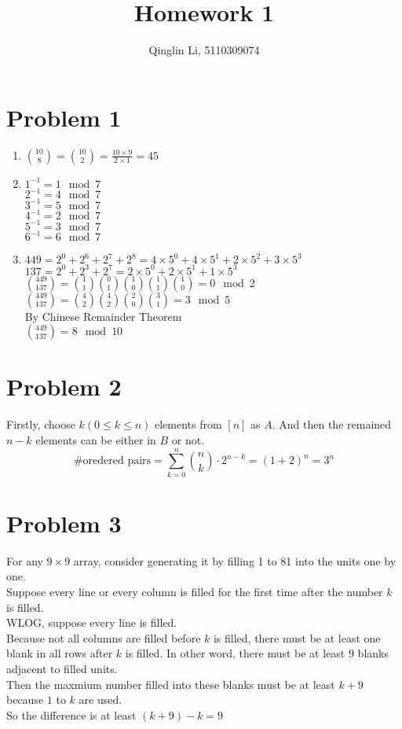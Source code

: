 \documentclass[12pt]{article}
\date{}
\title{Homework 1}
\author{Qinglin Li, 5110309074}
\begin{document}
\maketitle
\section*{Problem 1}
\begin{enumerate}
\item
$\binom{10}{8}=\binom{10}{2}=\frac{10\times9}{2\times1}=45$
\item
$1^{-1}=1\mod{7}$\\
$2^{-1}=4\mod{7}$\\
$3^{-1}=5\mod{7}$\\
$4^{-1}=2\mod{7}$\\
$5^{-1}=3\mod{7}$\\
$6^{-1}=6\mod{7}$
\item
$449=2^0+2^6+2^7+2^8=4\times5^0+4\times5^1+2\times5^2+3\times5^3$\\
$137=2^0+2^3+2^7=2\times5^0+2\times5^1+1\times5^3$\\
$\binom{449}{137}=\binom{1}{1}\binom{0}{1}\binom{1}{0}\binom{1}{1}\binom{1}{0}=0\mod{2}$\\
$\binom{449}{137}=\binom{4}{2}\binom{4}{2}\binom{2}{0}\binom{3}{1}=3 \mod{5}$\\

By Chinese Remainder Theorem\\
$\binom{449}{137}=8 \mod10$
\end{enumerate}

\section*{Problem 2}
Firstly, choose $k(0\leq k \leq n)$ elements from $[n]$ as $A$. And then the remained $n-k$ elements can be either in $B$ or not.\\
$$\# \text{oredered pairs} = \sum_{k=0}^n \binom{n}{k}\cdot2^{n-k}=(1+2)^n=3^n$$

\section*{Problem 3}
For any $9\times9$ array, consider generating it by filling 1 to 81 into the units one by one.\\
Suppose every line or every column is filled for the first time after the number $k$ is filled.\\
WLOG, suppose every line is filled.\\
Because not all columns are filled before $k$ is filled, there must be at least one blank in all rows after $k$ is filled. In other word, there must be at least $9$ blanks adjacent to filled units.\\
Then the maxmium number filled into these blanks must be at least $k+9$ because $1$ to $k$ are used.\\
So the difference is at least $(k+9)-k=9$
\end{document}

